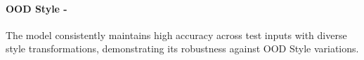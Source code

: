 \paragraph{OOD Style - \low} The model consistently maintains high accuracy across test inputs with diverse style transformations, demonstrating its robustness against OOD Style variations. 
